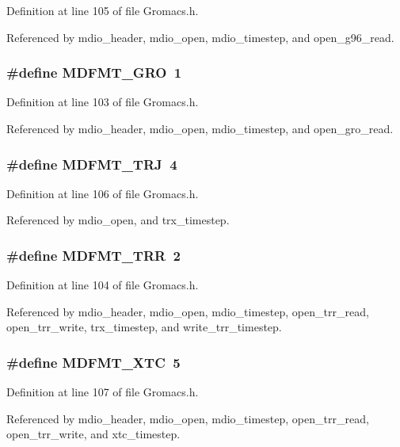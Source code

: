 Definition at line 105 of file Gromacs.h.

Referenced by mdio\_\-header, mdio\_\-open, mdio\_\-timestep, and open\_\-g96\_\-read.
\subsubsection{\setlength{\rightskip}{0pt plus 5cm}\#define MDFMT\_\-GRO\ 1}\label{Gromacs_8h_a25}




Definition at line 103 of file Gromacs.h.

Referenced by mdio\_\-header, mdio\_\-open, mdio\_\-timestep, and open\_\-gro\_\-read.
\subsubsection{\setlength{\rightskip}{0pt plus 5cm}\#define MDFMT\_\-TRJ\ 4}\label{Gromacs_8h_a28}




Definition at line 106 of file Gromacs.h.

Referenced by mdio\_\-open, and trx\_\-timestep.
\subsubsection{\setlength{\rightskip}{0pt plus 5cm}\#define MDFMT\_\-TRR\ 2}\label{Gromacs_8h_a26}




Definition at line 104 of file Gromacs.h.

Referenced by mdio\_\-header, mdio\_\-open, mdio\_\-timestep, open\_\-trr\_\-read, open\_\-trr\_\-write, trx\_\-timestep, and write\_\-trr\_\-timestep.
\subsubsection{\setlength{\rightskip}{0pt plus 5cm}\#define MDFMT\_\-XTC\ 5}\label{Gromacs_8h_a29}




Definition at line 107 of file Gromacs.h.

Referenced by mdio\_\-header, mdio\_\-open, mdio\_\-timestep, open\_\-trr\_\-read, open\_\-trr\_\-write, and xtc\_\-timestep.
